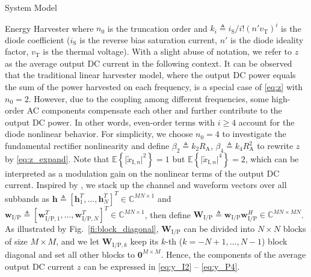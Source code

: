 \documentclass[journal]{IEEEtran}
\begin{document}
\begin{section}{System Model}
\begin{subsection}{Energy Harvester}
			where $n_0$ is the truncation order and $k_i \triangleq i_{\mathrm{S}}/i!(n'v_{\mathrm{T}})^i$ is the diode coefficient ($i_{\mathrm{S}}$ is the reverse bias saturation current, $n'$ is the diode ideality factor, $v_{\mathrm{T}}$ is the thermal voltage). With a slight abuse of notation, we refer to $z$ as the average output DC current in the following context. It can be observed that the traditional linear harvester model, where the output DC power equals the sum of the power harvested on each frequency, is a special case of \eqref{eq:z} with $n_0=2$. However, due to the coupling among different frequencies, some high-order AC components compensate each other and further contribute to the output DC power. In other words, even-order terms with $i \ge 4$ account for the diode nonlinear behavior. For simplicity, we choose $n_0=4$ to investigate the fundamental rectifier nonlinearity and define $\beta_2 \triangleq {k_2}{R_{\mathrm{A}}}$, $\beta_4 \triangleq {k_4}{R_{\mathrm{A}}^2}$ to rewrite $z$ by \eqref{eq:z_expand}. Note that $\mathbb{E}\left\{\lvert\tilde{x}_{\mathrm{I},n}\rvert^2\right\}=1$ but $\mathbb{E}\left\{\lvert\tilde{x}_{\mathrm{I},n}\rvert^4\right\}=2$, which can be interpreted as a modulation gain on the nonlinear terms of the output DC current. Inspired by \cite{Huang2017}, we stack up the channel and waveform vectors over all subbands as $\boldsymbol{h} \triangleq [\boldsymbol{h}_1^T,\dots,\boldsymbol{h}_N^T]^T \in \mathbb{C}^{MN \times 1}$ and $\boldsymbol{w}_{\mathrm{I/P}} \triangleq [\boldsymbol{w}_{\mathrm{I/P},1}^T,\dots,\boldsymbol{w}_{\mathrm{I/P},N}^T]^T \in \mathbb{C}^{MN \times 1}$, then define $\boldsymbol{W}_{\mathrm{I/P}} \triangleq \boldsymbol{w}_{\mathrm{I/P}}\boldsymbol{w}_{\mathrm{I/P}}^H \in \mathbb{C}^{MN \times MN}$. As illustrated by Fig.~\ref{fi:block_diagonal}, $\boldsymbol{W}_{\mathrm{I/P}}$ can be divided into $N \times N$ blocks of size $M \times M$, and we let $\boldsymbol{W}_{\mathrm{I/P},k}$ keep its $k$-th ($k=-N+1,\dots,N-1$) block diagonal and set all other blocks to $\boldsymbol{0}^{M \times M}$. Hence, the components of the average output DC current $z$ can be expressed in \eqref{eq:y_I2} -- \eqref{eq:y_P4}.


\end{subsection}
\end{section}
\end{document}
